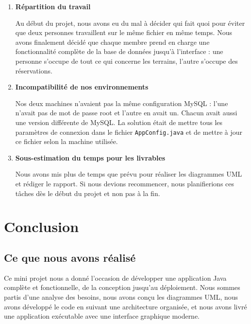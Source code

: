 \documentclass[12pt, a4paper]{report}
\begin{document}
\begin{enumerate}

  \item \textbf{Répartition du travail}

  Au début du projet, nous avons eu du mal à décider qui fait quoi pour
  éviter que deux personnes travaillent sur le même fichier en même temps.
  Nous avons finalement décidé que chaque membre prend en charge une
  fonctionnalité complète de la base de données jusqu'à l'interface : une
  personne s'occupe de tout ce qui concerne les terrains, l'autre s'occupe
  des réservations.

  \item \textbf{Incompatibilité de nos environnements}

  Nos deux machines n'avaient pas la même configuration MySQL : l'une
  n'avait pas de mot de passe root et l'autre en avait un. Chacun avait
  aussi une version différente de MySQL. La solution était de mettre tous
  les paramètres de connexion dans le fichier \texttt{AppConfig.java}
  et de mettre à jour ce fichier selon la machine utilisée.

  \item \textbf{Sous-estimation du temps pour les livrables}

  Nous avons mis plus de temps que prévu pour réaliser les diagrammes UML
  et rédiger le rapport. Si nous devions recommencer, nous planifierions
  ces tâches dès le début du projet et non pas à la fin.

\end{enumerate}

\chapter{Conclusion}

\section*{Ce que nous avons réalisé}

Ce mini projet nous a donné l'occasion de développer une application Java
complète et fonctionnelle, de la conception jusqu'au déploiement. Nous sommes
partis d'une analyse des besoins, nous avons conçu les diagrammes UML, nous
avons développé le code en suivant une architecture organisée, et nous avons
livré une application exécutable avec une interface graphique moderne.
\end{document}
